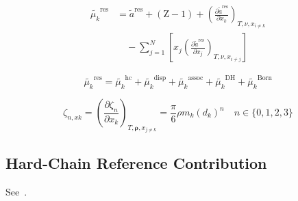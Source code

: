 \documentclass[12pt, letterpaper]{article}
\begin{document}
\begin{equation}
    \begin{aligned}
        \tilde{\mu_{k}}^{\mathrm{res}}
        &=\tilde{a}^{\mathrm{res}}+(\mathrm{Z}-1)
        +\left(\frac{\partial\tilde{a}^{\mathrm{res}}}{\partial x_{k}}\right)_{T,\nu,x_{i\neq k}}
        \\
        &\quad -\sum_{j=1}^{N}\left[x_{j}\left(\frac{\partial\tilde{a}^{\mathrm{res}}}{\partial x_{j}}\right)_{T,\nu,x_{i\neq j}}\right]
    \end{aligned}
    \label{eq:mu_res_from_ares}
\end{equation}


\begin{equation}
    \tilde{\mu_{k}}^{\mathrm{res}}=\tilde{\mu_{k}}^{\mathrm{hc}}+\tilde{\mu_{k}}^{\mathrm{disp}}+\tilde{\mu_{k}}^{\mathrm{assoc}}+\tilde{\mu_{k}}^{\mathrm{DH}}+\tilde{\mu_{k}}^{\mathrm{Born}}
    \label{eq:mu_res_sum}
\end{equation}


\begin{equation}
    \zeta_{n,xk}=\left(\frac{\partial\zeta_{n}}{\partial x_{k}}\right)_{T,\boldsymbol{\rho},x_{j\neq k}}=\frac{\pi}{6}\rho m_{k}(d_{k})^{n}\quad n\in\{0,1,2,3\}
    \label{eq:zeta_n_xk}
\end{equation}

\subsection{Hard-Chain Reference Contribution}

See~\cite{Gross2001}.
\end{document}
